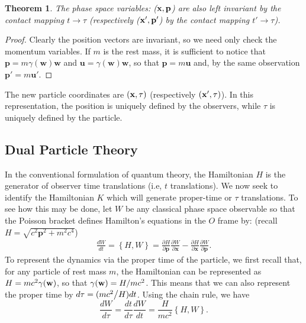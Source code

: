 \documentclass[11pt, reqno]{amsart}
\newcommand{\beqn}{\begin{eqnarray}}
\newcommand{\eeqn}{\end{eqnarray}}
\newcommand{\g}{\gamma}
\newtheorem{thm}{Theorem}[section]
\numberwithin{equation}{section}
\begin{document}
\begin{thm}The phase space variables: (${\bf{x}}, {\bf{p}}$) are also left invariant by the contact mapping  $t \to \tau$ (respectively (${\bf{x}'}, {\bf{p}'}$) by the contact mapping $t' \to \tau$). 
\end{thm}
\begin{proof} Clearly the position vectors are invariant, so we need only check the momentum variables.  If $m$ is the rest mass, it is sufficient to notice that ${\mathbf{p}} = m\gamma \left( {\mathbf{w}} \right){\mathbf{w}}$ and ${\mathbf{u}} = \gamma \left( {\mathbf{w}} \right){\mathbf{w}}$, so that ${\mathbf{p}} = m{\mathbf{u}}$ and, by the same observation ${\mathbf{p}'} = m{\mathbf{u}'}$.
\end{proof}
The new particle coordinates are $({\bf{x}}, \tau)$ (respectively $({\bf{x}'}, \tau)$).  In this representation, the position is uniquely defined by the observers, while $\tau$ is uniquely defined by the particle. 
\subsection{\bf Dual Particle Theory}
In the conventional formulation of quantum theory, the Hamiltonian $H$ is the generator of observer time translations (i.e, $t$ translations). We now seek to identify the Hamiltonian $K$ which will generate  proper-time or $\tau$ translations. To see how this may be done, let $W$ be any classical phase space observable so that the Poisson bracket defines Hamilton's equations in the $O$ frame by: (recall $H = \sqrt {{c^2}{{\mathbf{p}}^2} + {m^2}{c^4}} $)
\beqn
\frac{{dW}}{{dt}} = \left\{ {H,W} \right\} = \frac{{\partial H}}{{\partial {\mathbf{p}}}}\frac{{\partial W}}{{\partial {\mathbf{x}}}} - \frac{{\partial H}}{{\partial {\mathbf{x}}}}\frac{{\partial W}}{{\partial {\mathbf{p}}}}.
\eeqn
To represent the dynamics via the proper time of the particle, we first recall that, for any particle of rest mass $m$, the Hamiltonian  can be represented as $H = mc^2\g({\bf{w}})$, so that $\g({\bf{w}}) = H/mc^2$. This means that we can also represent the proper time by $d\tau  = ({{mc^2 } \mathord{\left/ {\vphantom {{mc^2 } H}} \right. \kern-\nulldelimiterspace} H})dt$.  Using the chain rule, we have
\[
\frac{{dW}}{{d\tau }} = \frac{{dt}}{{d\tau }}\frac{{dW}}{{dt}} = \frac{H}
{{mc^2 }}\left\{ {H,W} \right\}.
\]
\end{document}

